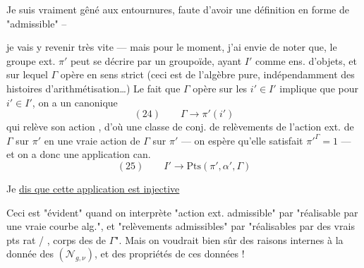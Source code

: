 
 Je suis vraiment gêné
aux entournures, faute d'avoir une
définition en forme de "admissible" --


je vais y revenir très vite --- mais
pour le moment, j'ai envie de noter que,
le groupe ext. $\pi'$ peut se décrire par
un  groupoïde, ayant $I'$ comme ens.
d'objets, et sur lequel $\Gamma$ opère en
sens strict (ceci est de l'algèbre pure,
indépendamment des histoires d'arithmétisation\ldots)
Le fait que $\Gamma$ opère 
sur les $i'\in I'$ implique que pour 
$i'\in I'$, on a un 
 canonique
\[
(24)\qquad \Gamma\longrightarrow\pi'(i')
\]
qui relève son action , d'où
une  classe de conj. de relèvements
de l'action ext. de $\Gamma$ sur $\pi'$
en une vraie action de $\Gamma$ sur $\pi'$
--- on espère qu'elle satisfait ${\pi'}^{\Gamma}=1$ ---
et on a donc une application can.
\[
(25)\qquad I'\longrightarrow\mathrm{Pts}(\pi',\alpha',\Gamma)
\]


Je \uline{dis que cette application est injective}

Ceci est "évident" quand on interprète
"action ext. admissible" par "réalisable
par une vraie courbe alg.", et
"relèvements admissibles" par "réalisables
par des vrais pts rat / , corps des
 de $\Gamma$". Mais on voudrait
bien sûr des raisons internes à
la donnée des $(\mathcal N_{g,\nu})$, et des \unsure{)}
propriétés de ces données ! 


